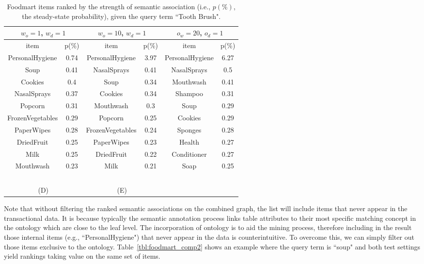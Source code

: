 \begin{table*}[tbh]
\begin{center}
\begin{tabular}{ c c | c c | c c }
\hline
\multicolumn{2}{c|}{$w_o=1$, $w_d=1$}&\multicolumn{2}{c|}{$w_o=10$, $w_d=1$}&\multicolumn{2}{c}{$o_w=20$, $o_d=1$}\\
\hline
item	&	p(\%)	&	item	&	p(\%)	&	item	&	p(\%)	\\
				\hline							
PersonalHygiene	&	0.74	&	PersonalHygiene	&	3.97	&	PersonalHygiene	&	6.27	\\
Soup	&	0.41	&	NasalSprays	&	0.41	&	NasalSprays	&	0.5	\\
Cookies	&	0.4	&	Soup	&	0.34	&	Mouthwash	&	0.41	\\
NasalSprays	&	0.37	&	Cookies	&	0.34	&	Shampoo	&	0.31	\\
Popcorn	&	0.31	&	Mouthwash	&	0.3	&	Soup	&	0.29	\\
FrozenVegetables	&	0.29	&	Popcorn	&	0.25	&	Cookies	&	0.29	\\
PaperWipes	&	0.28	&	FrozenVegetables	&	0.24	&	Sponges	&	0.28	\\
DriedFruit	&	0.25	&	PaperWipes	&	0.23	&	Health	&	0.27	\\
Milk	&	0.25	&	DriedFruit	&	0.22	&	Conditioner	&	0.27	\\
Mouthwash	&	0.23	&	Milk	&	0.21	&	Soap	&	0.25	\\
\hline
\multicolumn{4}{c}{~}\\
\multicolumn{2}{c}{(D)}  &  \multicolumn{2}{c}{(E)}  \\
\end{tabular}
\end{center}
\caption[Top results on the Foodmart dataset.]{\label{tbl:foodmart_comp} Foodmart items ranked by the strength of semantic association  (i.e., $p(\%)$, the steady-state probability), given the query term ``Tooth Brush".}
\end{table*}

Note that without filtering the ranked semantic associations on the combined graph, the list will include items that never appear in the transactional data. It is because typically the semantic annotation process links table attributes to their most specific matching concept in the ontology which are close to the leaf level. The incorporation of ontology is to aid the mining process, therefore including in the result those internal items (e.g., ``PersonalHygiene") that never appear in the data is counterintuitive. To overcome this, we can simply filter out those items exclusive to the ontology. Table~\ref{tbl:foodmart_comp2} shows an example where the query term is ``soup" and both test settings yield rankings taking value on the same set of items.

